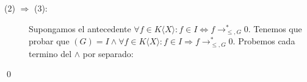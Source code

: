 \documentclass[12pt]{report}
\theoremstyle{customstyle}
\renewenvironment{proof}[1][\proofname]{{\noindent \bfseries #1: }}{\qed} %
\theoremstyle{factstyle}
\begin{document}
\begin{proof}
\begin{description}











    \item[(2) $⇒$ (3):] Supongamos el antecedente $∀f ∈ K⟨X⟩ : f ∈ I ⇔ f →^*_{≤, G} 0$. Tenemos que probar que $(G) = I ∧ ∀f ∈ K⟨X⟩ : f ∈ I ⇒ f →^*_{≤, G} 0$. Probemos cada termino del $∧$ por separado:


\end{description}
\end{proof}
\end{document}
